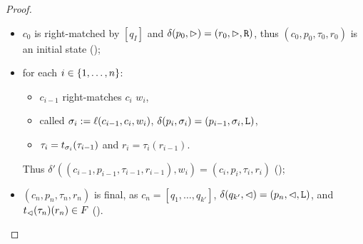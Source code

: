 \begin{proof}
	\begin{itemize}
		\item $c_0$ is right-matched by $[q_I]$ and $\delta(p_0,\rhd)=(r_0,\rhd,\mathtt R)$, thus $(c_0,p_0,\tau_0,r_0)$ is an initial state ();
		\item for each $i\in\{1,\dots,n\}$:
		      \begin{itemize}
			      \item $c_{i-1}$ right-matches $c_i$ \wrt $w_i$,
			      \item called $\sigma_i:=\ell(c_{i-1},c_i,w_i)$, $\delta(p_i,\sigma_i)=(p_{i-1},\sigma_i,\mathtt L)$,
			      \item $\tau_i=t_{\sigma_i}(\tau_{i-1})$ and $r_i=\tau_i(r_{i-1})$.
		      \end{itemize}
		      Thus $\delta'((c_{i-1},p_{i-1},\tau_{i-1},r_{i-1}),w_i)=(c_i,p_i,\tau_i,r_i)$ ();
		\item $(c_n,p_n,\tau_n,r_n)$ is final, as $c_n=[q_1,\dots,q_{k'}]$, $\delta(q_{k'},\lhd)=(p_n,\lhd,\mathtt L)$, and $t_\lhd(\tau_n)(r_n)\in F$ (). \qedhere
	\end{itemize}
\end{proof}

